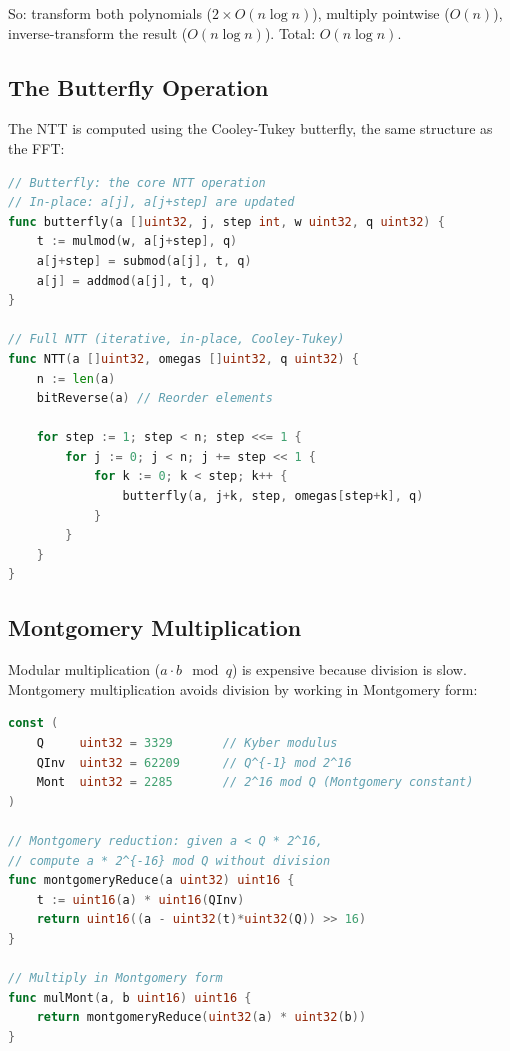 \documentclass[11pt,a4paper]{article}
\begin{document}
So: transform both polynomials ($2 \times O(n \log n)$), multiply pointwise ($O(n)$),
inverse-transform the result ($O(n \log n)$). Total: $O(n \log n)$.

\subsection{The Butterfly Operation}

The NTT is computed using the Cooley-Tukey butterfly, the same structure as the FFT:

\begin{lstlisting}[language=Go,caption={NTT butterfly operation in Go}]
// Butterfly: the core NTT operation
// In-place: a[j], a[j+step] are updated
func butterfly(a []uint32, j, step int, w uint32, q uint32) {
    t := mulmod(w, a[j+step], q)
    a[j+step] = submod(a[j], t, q)
    a[j] = addmod(a[j], t, q)
}

// Full NTT (iterative, in-place, Cooley-Tukey)
func NTT(a []uint32, omegas []uint32, q uint32) {
    n := len(a)
    bitReverse(a) // Reorder elements

    for step := 1; step < n; step <<= 1 {
        for j := 0; j < n; j += step << 1 {
            for k := 0; k < step; k++ {
                butterfly(a, j+k, step, omegas[step+k], q)
            }
        }
    }
}
\end{lstlisting}

\subsection{Montgomery Multiplication}

Modular multiplication ($a \cdot b \mod q$) is expensive because division is slow.
Montgomery multiplication avoids division by working in Montgomery form:

\begin{lstlisting}[language=Go,caption={Montgomery multiplication}]
const (
    Q     uint32 = 3329       // Kyber modulus
    QInv  uint32 = 62209      // Q^{-1} mod 2^16
    Mont  uint32 = 2285       // 2^16 mod Q (Montgomery constant)
)

// Montgomery reduction: given a < Q * 2^16,
// compute a * 2^{-16} mod Q without division
func montgomeryReduce(a uint32) uint16 {
    t := uint16(a) * uint16(QInv)
    return uint16((a - uint32(t)*uint32(Q)) >> 16)
}

// Multiply in Montgomery form
func mulMont(a, b uint16) uint16 {
    return montgomeryReduce(uint32(a) * uint32(b))
}
\end{lstlisting}
\end{document}

